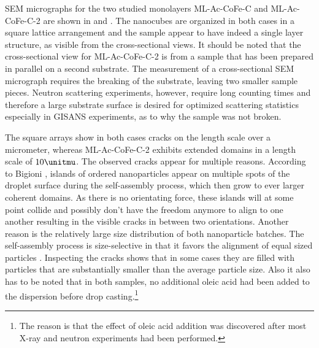 \documentclass[\main/dresen_thesis.tex]{subfiles}
\begin{document}
  SEM micrographs for the two studied monolayers ML-Ac-CoFe-C and ML-Ac-CoFe-C-2 are shown in  and .
  The nanocubes are organized in both cases in a square lattice arrangement and the sample appear to have indeed a single layer structure, as visible from the cross-sectional views.
  It should be noted that the cross-sectional view for ML-Ac-CoFe-C-2 is from a sample that has been prepared in parallel on a second substrate.
  The measurement of a cross-sectional SEM micrograph requires the breaking of the substrate, leaving two smaller sample pieces.
  Neutron scattering experiments, however, require long counting times and therefore a large substrate surface is desired for optimized scattering statistics especially in GISANS experiments, as to why the sample was not broken.

  The square arrays show in both cases cracks on the length scale over a micrometer, whereas ML-Ac-CoFe-C-2 exhibits extended domains in a length scale of $10 \unitmu$.
  The observed cracks appear for multiple reasons.
  According to Bigioni \etal \cite{Bigioni_2006_Kinet}, islands of ordered nanoparticles appear on multiple spots of the droplet surface during the self-assembly process, which then grow to ever larger coherent domains.
  As there is no orientating force, these islands will at some point collide and possibly don't have the freedom anymore to align to one another resulting in the visible cracks in between two orientations.
  Another reason is the relatively large size distribution of both nanoparticle batches.
  The self-assembly process is size-selective in that it favors the alignment of equal sized particles \cite{Rabideau_2007_Obser}.
  Inspecting the cracks shows that in some cases they are filled with particles that are substantially smaller than the average particle size.
  Also it also has to be noted that in both samples, no additional oleic acid had been added to the dispersion before drop casting.\footnote{The reason is that the effect of oleic acid addition was discovered after most X-ray and neutron experiments had been performed.}
\end{document}
